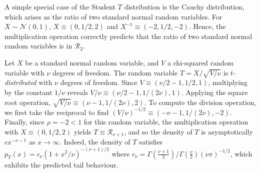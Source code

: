 \documentclass[thesis.tex]{subfiles}
\begin{document}
\begin{example}
	A simple special case of the Student $T$ distribution is the Cauchy distribution, which arises as the ratio of two standard normal random variables. For $X\sim\mathcal{N}(0,1)$, $X \equiv (0,1/2,2)$ and $X^{-1} \equiv (-2,1/2,-2)$. %
	Hence, the multiplication operation correctly predicts that the ratio of two standard normal random variables is in $\mathcal{R}_2$.
\end{example}


\begin{example}
	Let $X$ be a standard normal random variable, and $V$ a chi-squared random variable with $\nu$ degrees of freedom. The random variable $T = X / \sqrt{V / \nu}$ is \emph{$t$-distributed} with $\nu$ degrees of freedom. Since $V \equiv (\nu/2-1,1/2,1)$, multiplying by the constant $1/\nu$ reveals $V / \nu \equiv (\nu/2-1,1/(2\nu),1)$. Applying the square root operation, $\sqrt{V / \nu} \equiv (\nu-1,1/(2\nu),2)$. To compute the division operation, we first take the reciprocal to find $(V/\nu)^{-1/2} \equiv (-\nu-1,1/(2\nu),-2)$. Finally, since $\rho = -2 < 1$ for this random variable, the multiplication operation with $X \equiv (0,1/2,2)$ yields $T \equiv \mathcal{R}_{\nu+1}$, and so the density of $T$ is asymptotically $c x^{-\nu-1}$ as $x \to \infty$.
	Indeed, the density of $T$ satisfies $p_T(x) = c_\nu (1 + x^2 / \nu)^{-(\nu+1)/2}$ where $c_\nu = \Gamma(\frac{\nu+1}{2})/\Gamma(\frac{\nu}{2}) (\nu\pi)^{-1/2}$, which exhibits the predicted tail behaviour.
\end{example}
\end{document}
